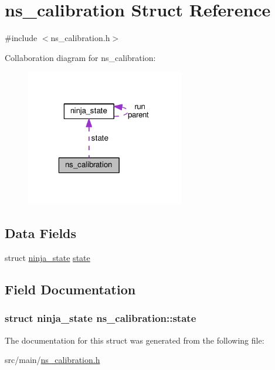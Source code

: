 \hypertarget{structns__calibration}{\section{ns\+\_\+calibration Struct Reference}
\label{structns__calibration}
}


{\ttfamily \#include $<$ns\+\_\+calibration.\+h$>$}



Collaboration diagram for ns\+\_\+calibration\+:\nopagebreak
\begin{figure}[H]
\begin{center}
\leavevmode
\includegraphics[width=196pt]{structns__calibration__coll__graph}
\end{center}
\end{figure}
\subsection*{Data Fields}
\begin{DoxyCompactItemize}
\item 
struct \hyperlink{structninja__state}{ninja\+\_\+state} \hyperlink{structns__calibration_afbc6f956ba6ac5a771b37ff22a75603e}{state}
\end{DoxyCompactItemize}


\subsection{Field Documentation}
\hypertarget{structns__calibration_afbc6f956ba6ac5a771b37ff22a75603e}{
\subsubsection[{state}]{\setlength{\rightskip}{0pt plus 5cm}struct {\bf ninja\+\_\+state} ns\+\_\+calibration\+::state}}\label{structns__calibration_afbc6f956ba6ac5a771b37ff22a75603e}


The documentation for this struct was generated from the following file\+:\begin{DoxyCompactItemize}
\item 
src/main/\hyperlink{ns__calibration_8h}{ns\+\_\+calibration.\+h}\end{DoxyCompactItemize}

